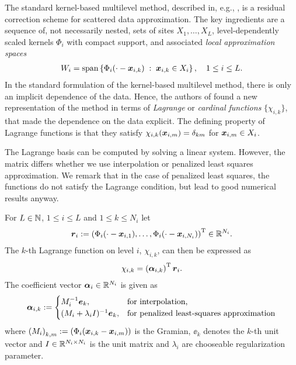 \documentclass[	a4paper, 
								11pt]{article}
\theoremstyle{plain}
\begin{document}
The standard kernel-based multilevel method, described in, e.g., \cite{wendland:multilevel}, is a residual correction scheme for scattered data approximation. The key ingredients are a sequence of, not necessarily nested, sets of sites \( X_1, \dots, X_L \), level-dependently scaled kernels $ \Phi_i $ with compact support, and associated \emph{local approximation spaces}
\begin{align*}
 W_i = \operatorname{span}\left\{ \Phi_i ( \cdot - \boldsymbol{x}_{i,k})
 \; : \; \boldsymbol{x}_{i,k} \in X_i \right \}, \quad 1 \leq i \leq L.
\end{align*}
In the standard formulation of the kernel-based multilevel method, there is only an implicit dependence of the data. Hence, the authors of \cite{kempf:TPML} found a new representation of the method in terms of \emph{Lagrange} or \emph{cardinal functions} $ \{ \chi_{i,k} \} $, that made the dependence on the data explicit. 
The defining property of Lagrange functions is that they satisfy $ \chi_{i,k} (\boldsymbol{x}_{i,m}) = \delta_{km} $ for $ \boldsymbol{x}_{i,m} \in X_i $.

The Lagrange basis can be computed by solving a linear system. However, the 
matrix differs whether we use interpolation or penalized least squares 
approximation. We remark that in the case of penalized least squares, the functions do not satisfy the Lagrange condition, but lead to good numerical results anyway.

\begin{definition}
For $ L \in \mathbb{N} $, $ 1 \leq i \leq L $ and $ 1 \leq k \leq 
N_i $ let 
\begin{align}\label{eq:definitionRVector}
 \boldsymbol{r}_i := \left( \Phi_i( \cdot - \boldsymbol{x}_{i,1}), \dots, 
\Phi_i( \cdot - \boldsymbol{x}_{i,N_i}) \right)^{\text{T}} \in \mathbb{R}^{N_i}.
 \end{align}
The $k$-th Lagrange function on level $ i $, $ \chi_{i,k} $, can then be expressed as
\begin{align}\label{eq:LagrangeFunctionVectorVectorProduct}
 \chi_{i,k} = \left(\boldsymbol{\alpha}_{i,k}\right)^{\text{T}} \boldsymbol{r}_i.
\end{align}
The coefficient vector $ \boldsymbol{\alpha}_{i} \in \mathbb{R}^{N_i} $ is given as
 \begin{align}\label{eq:coefficientVector}
  \boldsymbol{\alpha}_{i,k} := \begin{cases} 
				  M_i^{-1} \boldsymbol{e}_k, &\text{for interpolation,} \\
                  (M_i + \lambda_i I)^{-1} \boldsymbol{e}_k, &\text{for penalized 
                  least-squares approximation}
                 \end{cases}
 \end{align}
where $\left(M_i\right)_{k,m} := \left(\Phi_i( \boldsymbol{x}_{i,k} - 
 \boldsymbol{x}_{i,m}) \right)$ is the Gramian, $ \ee_k $ denotes the $ k $-th unit vector and 
 $ I \in \mathbb{R}^{N_i \times N_i} $ is the unit matrix and $ \lambda_i $ are chooseable regularization parameter.
\end{definition}
\end{document}
